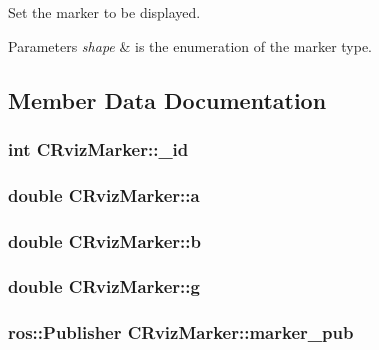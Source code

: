 Set the marker to be displayed. 


\begin{DoxyParams}{Parameters}
{\em shape} & is the enumeration of the marker type. \\
\hline
\end{DoxyParams}


\subsection{Member Data Documentation}
\hypertarget{classCRvizMarker_adc420093c48e69c28b80ccc0181faab5}{
\subsubsection[{\-\_\-id}]{\setlength{\rightskip}{0pt plus 5cm}int C\-Rviz\-Marker\-::\-\_\-id}}\label{classCRvizMarker_adc420093c48e69c28b80ccc0181faab5}
\hypertarget{classCRvizMarker_a93c527fccbe4672668b497d5b4976704}{
\subsubsection[{a}]{\setlength{\rightskip}{0pt plus 5cm}double C\-Rviz\-Marker\-::a}}\label{classCRvizMarker_a93c527fccbe4672668b497d5b4976704}
\hypertarget{classCRvizMarker_aef6cbf7b2feda8b072863547c9c0719d}{
\subsubsection[{b}]{\setlength{\rightskip}{0pt plus 5cm}double C\-Rviz\-Marker\-::b}}\label{classCRvizMarker_aef6cbf7b2feda8b072863547c9c0719d}
\hypertarget{classCRvizMarker_ad57f170c6e6757617c990c255c28ad3c}{
\subsubsection[{g}]{\setlength{\rightskip}{0pt plus 5cm}double C\-Rviz\-Marker\-::g}}\label{classCRvizMarker_ad57f170c6e6757617c990c255c28ad3c}
\hypertarget{classCRvizMarker_a5cc00e270e464a0c3be4a73ebd9f5aaa}{
\subsubsection[{marker\-\_\-pub}]{\setlength{\rightskip}{0pt plus 5cm}ros\-::\-Publisher C\-Rviz\-Marker\-::marker\-\_\-pub}}\label{classCRvizMarker_a5cc00e270e464a0c3be4a73ebd9f5aaa}
